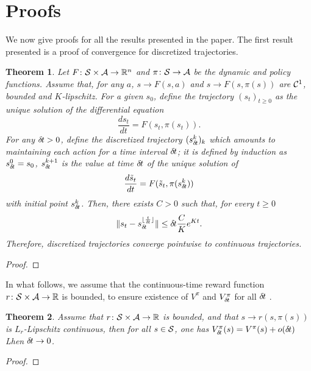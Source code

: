 \documentclass[11pt]{article}
\newtheorem{theorem}{Theorem}
\begin{document}
\section{Proofs}
We now give proofs for all the results presented in the paper.
The first result presented is a proof of convergence for discretized
trajectories.
\begin{theorem}
	Let $F\colon {\cal S} \times {\cal A} \rightarrow \mathbb{R}^n$ and $\pi\colon {\cal S}
	\rightarrow {\cal A}$ be the dynamic and policy functions. Assume that,
	for any $a$, $s \rightarrow F(s, a)$ and $s \rightarrow F(s, \pi(s))$
	are ${\cal C}^1$, bounded and $K$-lipschitz.  For
	a given $s_0$, define the trajectory $(s_t)_{t\geq 0}$ as the unique
	solution of the differential equation
	\begin{equation}
		\frac{ds_t}{dt} = F(s_t, \pi(s_t)).
		\label{eq:diff}
	\end{equation}
	For any ${\delta\hspace{-.1em}t} > 0$, define the discretized trajectory
	$(s_{\delta\hspace{-.1em}t}^k)_k$ which amounts to maintaining each action for a
	time interval ${\delta\hspace{-.1em}t}$; it is defined by induction as $s_{\delta\hspace{-.1em}t}^0 = s_0$,
	$s_{\delta\hspace{-.1em}t}^{k + 1}$ is the value at time ${\delta\hspace{-.1em}t}$ of
	the unique solution of
	\begin{equation}
		\frac{d\tilde{s}_t}{dt} = F(\tilde{s}_t, \pi(s_{\delta\hspace{-.1em}t}^k))
	\end{equation}
	with initial point $s_{\delta\hspace{-.1em}t}^k$.
	Then, there exists $C > 0$ such that, for every $t \geq 0$
	\begin{equation}
		\|s_t - s_{\delta\hspace{-.1em}t}^{\lfloor \frac{t}{{\delta\hspace{-.1em}t}} \rfloor}\|
		\leq {\delta\hspace{-.1em}t} \frac{C}{K}e^{Kt}.
	\end{equation}
	Therefore, discretized trajectories converge pointwise to continuous trajectories.
	\label{th:traj-conv}
\end{theorem}
\begin{proof}
	
\end{proof}

In what follows, we assume that the continuous-time reward function $r\colon {\cal S} \times {\cal A} \rightarrow \mathbb{R}$
is bounded, to ensure existence of $V^\pi$ and $V^\pi_{\delta\hspace{-.1em}t}$ for all ${\delta\hspace{-.1em}t}$
.\begin{theorem}
	Assume that $r\colon {\cal S} \times {\cal A} \rightarrow \mathbb{R}$ is bounded, and
	that $s \rightarrow r(s, \pi(s))$ is $L_r$-Lipschitz continuous, then
	for all $s \in {\cal S}$, one has
	$V^\pi_{\delta\hspace{-.1em}t}(s) = V^\pi(s) + o({\delta\hspace{-.1em}t})$
	Lhen ${\delta\hspace{-.1em}t}\to 0$.
	\label{th:conv-value}
\end{theorem}
\begin{proof}
	
\end{proof}
\end{document}
